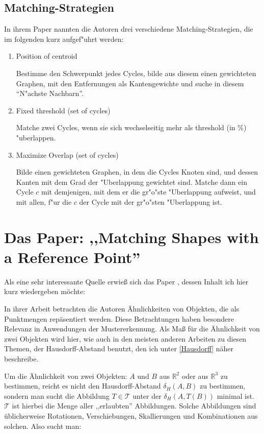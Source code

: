 \subsection{Matching-Strategien}
In ihrem Paper nannten die Autoren drei verschiedene Matching-Strategien, die im folgenden kurz aufgef"uhrt werden:
\begin{enumerate}
\item Position of centroid

Bestimme den Schwerpunkt jedes Cycles,  bilde aus diesem einen gewichteten Graphen, mit den Entfernungen als Kantengewichte und suche in diesem "`N"achste Nachbarn"'.
\item Fixed threshold (set of cycles)

Matche zwei Cycles, wenn sie sich wechselseitig  mehr als threshold (in \%) "uberlappen.

\item Maximize Overlap (set of cycles)

Bilde einen gewichteten Graphen, in dem die Cycles Knoten sind, und dessen Kanten mit dem Grad der "Uberlappung gewichtet sind. Matche dann ein Cycle $c$ mit demjenigen, mit dem er die gr"o"ste "Uberlappung aufweist, und mit allen, f"ur die $c$ der Cycle mit der gr"o"sten "Uberlappung ist.
\end{enumerate} 

\section{Das Paper: ,,Matching Shapes with a Reference Point''  }


Als eine sehr interessante Quelle erwieß sich das Paper \cite{AAR}, dessen Inhalt ich hier kurz wiedergeben möchte:

In ihrer Arbeit betrachten die Autoren Ähnlichkeiten von Objekten, die als Punktmengen repäsentiert werden. Diese Betrachtungen haben besondere Relevanz in Anwendungen der Mustererkennung. Als Maß für die Ähnlichkeit von zwei Objekten wird hier, wie auch in den meisten anderen Arbeiten zu diesen Themen, der Hausdorff-Abstand benutzt, den ich unter \ref{Hausdorff} näher beschreibe.

Um die Ähnlichkeit von zwei Objekten: $A$ und $B$ aus $\mathbb{R}^2$ oder aus $\mathbb{R}^3$ zu bestimmen, reicht es nicht den Hausdorff-Abstand $\delta_H(A,B)$ zu bestimmen, sondern man sucht die Abbildung $T\in\mathcal{T}$ unter der $\delta_H(A,T(B))$ minimal ist. $\mathcal{T}$ ist hierbei die Menge aller ,,erlaubten'' Abbildungen. Solche Abbildungen sind üblicherweise Rotationen, Verschiebungen, Skallierungen und Kombinationen aus solchen. Also sucht man:

